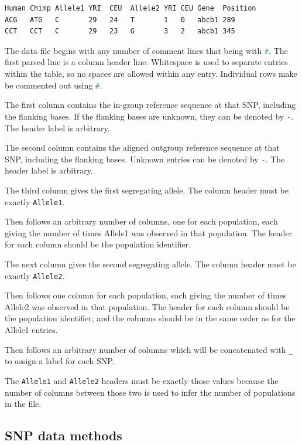 \documentclass[12pt]{article}
\makeatletter
\newcommand{\py}[1]{\lstinline[language=Python, showstringspaces=False]@#1@}
\makeatother
\begin{document}
\begin{lstlisting}[caption={Example of SNP file format}, float, label={lst:SNP_data}]
Human Chimp Allele1 YRI  CEU  Allele2 YRI CEU Gene  Position
ACG   ATG   C       29   24   T       1   0   abcb1 289
CCT   CCT   C       29   23   G       3   2   abcb1 345
\end{lstlisting}

The data file begins with any number of comment lines that being with \py{#}.
The first parsed line is a column header line.
Whitespace is used to separate entries within the table, so no spaces are allowed within any entry.
Individual rows make be commented out using \py{#}.

The first column contains the in-group reference sequence at that SNP, including the flanking bases.
If the flanking bases are unknown, they can be denoted by \py{-}.
The header label is arbitrary.

The second column contains the aligned outgroup reference sequence at that SNP, including the flanking bases.
Unknown entries can be denoted by \py{-}.
The header label is arbitrary.

The third column gives the first segregating allele.
The column header must be exactly \py{Allele1}.

Then follows an arbitrary number of columns, one for each population, each giving the number of times Allele1 was observed in that population.
The header for each column should be the population identifier.

The next column gives the second segregating allele.
The column header must be exactly \py{Allele2}.

Then follows one column for each population, each giving the number of times Allele2 was observed in that population.
The header for each column should be the population identifier, and the columns should be in the same order as for the Allele1 entries.

Then follows an arbitrary number of columns which will be concatenated with \py{_} to assign a label for each SNP.

The \py{Allele1} and \py{Allele2} headers must be exactly those values because the number of columns between those two is used to infer the number of populations in the file.

\subsection{SNP data methods}
\end{document}
